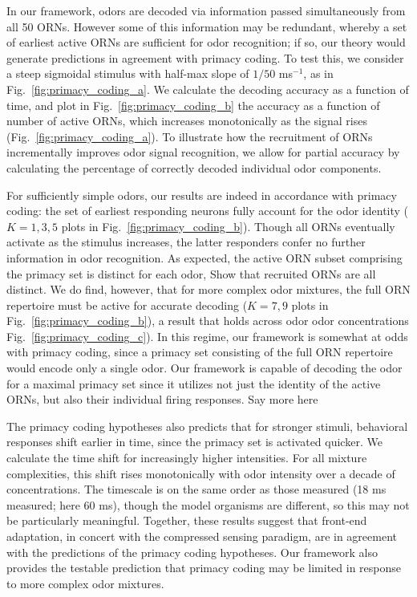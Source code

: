 In our framework, odors are decoded via information passed simultaneously from all 50 ORNs. However  some of this information may be redundant, whereby a set of earliest active ORNs are sufficient for odor recognition; if so, our theory would generate predictions in agreement with primacy coding. To test this, we consider a steep sigmoidal stimulus with half-max slope of $1/50$ ms$^{-1}$, as in Fig.~\ref{fig:primacy_coding_a}. We calculate the decoding accuracy as a function of time, and plot in Fig.~\ref{fig:primacy_coding_b} the accuracy as a function of number of active ORNs, which increases monotonically as the signal rises (Fig.~\ref{fig:primacy_coding_a}). To illustrate how the recruitment of ORNs incrementally improves odor signal recognition, we allow for partial accuracy by calculating  the percentage of correctly decoded individual odor components.

For sufficiently simple odors, our results are indeed in accordance with primacy coding: the set of earliest responding neurons fully account for the odor identity ($K=1, 3, 5$ plots in Fig.~\ref{fig:primacy_coding_b}). Though all ORNs eventually activate as the stimulus increases, the latter responders confer no further information in odor recognition. As expected, the active ORN subset comprising the primacy set is distinct for each odor,   {\color{blue} Show that recruited ORNs are all distinct}. We do find, however, that for more complex odor mixtures, the full ORN repertoire must be active for  accurate decoding ($K=7, 9$ plots in Fig.~\ref{fig:primacy_coding_b}), a result that holds across odor  odor concentrations Fig.~\ref{fig:primacy_coding_c}). In this regime, our framework is somewhat at odds with primacy coding, since a primacy set consisting of the full ORN repertoire would encode only a single odor. Our framework is capable of decoding the odor for a maximal primacy set since it utilizes not just the identity of the active ORNs, but also their individual firing responses. {\color{blue} Say more here}

The primacy coding hypotheses also predicts that for stronger stimuli, behavioral responses shift earlier in time, since the primacy set is activated quicker. We calculate the time shift for increasingly higher intensities. For all mixture complexities, this shift rises monotonically with odor intensity over a decade of concentrations.  The timescale is on the same order as those measured (18 ms measured; here 60 ms), though the model organisms are different, so this may not be particularly meaningful. Together, these results suggest that front-end adaptation, in concert with the compressed sensing paradigm, are in agreement with the predictions of the primacy coding hypotheses. Our framework also provides the testable prediction that primacy coding may be limited in response to more complex odor mixtures.

